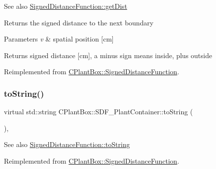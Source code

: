 \begin{DoxySeeAlso}{See also}
\hyperlink{classCPlantBox_1_1SignedDistanceFunction_a8e58237574af3673906bba84d5d14ee8}{Signed\+Distance\+Function\+::get\+Dist}
\end{DoxySeeAlso}
Returns the signed distance to the next boundary


\begin{DoxyParams}{Parameters}
{\em v} & spatial position \mbox{[}cm\mbox{]} \\
\hline
\end{DoxyParams}
\begin{DoxyReturn}{Returns}
signed distance \mbox{[}cm\mbox{]}, a minus sign means inside, plus outside 
\end{DoxyReturn}


Reimplemented from \hyperlink{classCPlantBox_1_1SignedDistanceFunction_a8e58237574af3673906bba84d5d14ee8}{C\+Plant\+Box\+::\+Signed\+Distance\+Function}.

\mbox{\label{classCPlantBox_1_1SDF__PlantContainer_acbbd3751b289a98858be25c20b4f7206}} 
\subsubsection{\texorpdfstring{to\+String()}{toString()}}
{\footnotesize\ttfamily virtual std\+::string C\+Plant\+Box\+::\+S\+D\+F\+\_\+\+Plant\+Container\+::to\+String (\begin{DoxyParamCaption}{ }\end{DoxyParamCaption})\hspace{0.3cm}{\ttfamily [inline]}, {\ttfamily [virtual]}}

\begin{DoxySeeAlso}{See also}
\hyperlink{classCPlantBox_1_1SignedDistanceFunction_a9f375961d9a24b06dc669ac67aa16fa6}{Signed\+Distance\+Function\+::to\+String} 
\end{DoxySeeAlso}


Reimplemented from \hyperlink{classCPlantBox_1_1SignedDistanceFunction_a9f375961d9a24b06dc669ac67aa16fa6}{C\+Plant\+Box\+::\+Signed\+Distance\+Function}.

\mbox{\label{classCPlantBox_1_1SDF__PlantContainer_a8ca6514a0f414aaa70526575d931edda}} 
